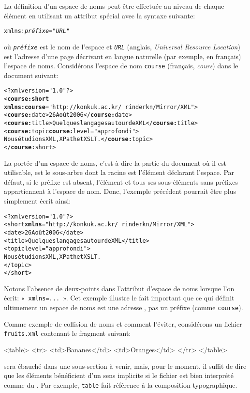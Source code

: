 La définition d'un espace de noms peut être effectuée au niveau de
chaque élément en utilisant un attribut spécial avec la syntaxe
suivante:
\begin{alltt}
\small{}xmlns:\textit{préfixe} = "\textit{URL}"
\end{alltt}
où \texttt{\emph{préfixe}} est le nom de l'espace et
\texttt{\emph{URL}} (anglais, \emph{Universal Resource Location}) est
l'adresse \HTTP d'une page \HTML décrivant en langue naturelle (par
exemple, en français) l'espace de noms. Considérons l'espace de nom
\texttt{course} (français, \emph{cours}) dans le document suivant:
\begin{alltt}
\small<?xml version="1.0"?>
<\textbf{course:short}
  \textbf{xmlns:course}="http://konkuk.ac.kr/~rinderkn/Mirror/XML">
 <\textbf{course:}date>26 Août 2006</\textbf{course:}date>
 <\textbf{course:}title>Quelques langages autour de XML</\textbf{course:}title>
 <\textbf{course:}topic \textbf{course:}level="approfondi">
   Nous étudions XML, XPath et XSLT.</\textbf{course:}topic>
</\textbf{course:}short>
\end{alltt}
La portée d'un espace de noms, c'est-à-dire la partie du document où
il est utilisable, est le sous-arbre dont la racine est l'élément
déclarant l'espace. Par défaut, si le préfixe est absent, l'élément et
tous ses sous-éléments sans préfixes appartiennent à l'espace de
nom. Donc, l'exemple précédent pourrait être plus simplement écrit ainsi:
\begin{alltt}
\small<?xml version="1.0"?>
<short \textbf{xmlns}="http://konkuk.ac.kr/~rinderkn/Mirror/XML">
 <date>26 Août 2006</date>
 <title>Quelques langages autour de XML</title>
 <topic level="approfondi">
   Nous étudions XML, XPath et XSLT.
 </topic>
</short>
\end{alltt}
Notons l'absence de deux-points dans l'attribut d'espace de noms
lorsque l'on écrit: «~\texttt{xmlns=...}~». Cet exemple illustre le fait
important que ce qui définit ultimement un espace de noms est une
adresse \HTTP, pas un préfixe (comme \texttt{course}).

Comme exemple de collision de noms et comment l'éviter, considérons un
fichier \texttt{fruits.xml} contenant le fragment \HTML suivant:
\begin{sverb}
<table>
  <tr>
    <td>Bananes</td>
    <td>Oranges</td>
  </tr>
</table>
\end{sverb}
\HTML sera ébauché dans une sous-section à venir, mais, pour le
moment, il suffit de dire que les éléments bénéficient d'un sens
implicite si le fichier est bien interprété comme du \HTML. Par
exemple, \texttt{table} fait référence à la composition typographique.

